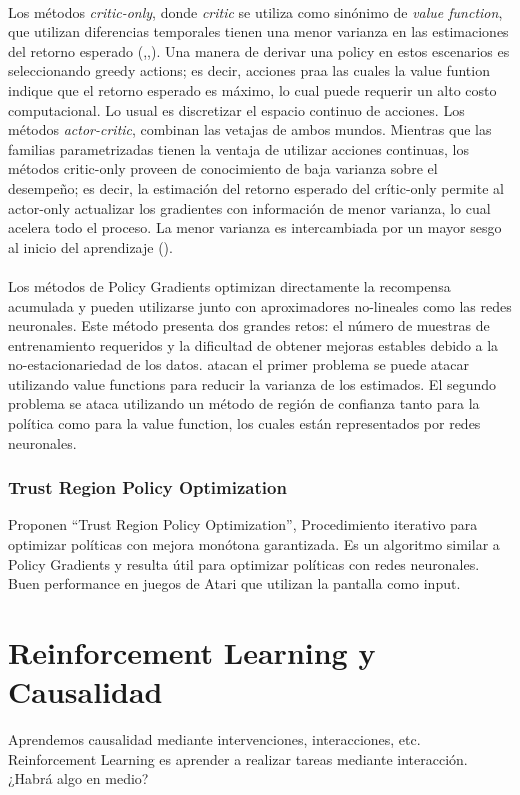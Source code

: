 \documentclass[11pt]{article}
\theoremstyle{plain}
\begin{document}
 \\
Los métodos \textit{critic-only}, donde \textit{critic} se utiliza como sinónimo de \textit{value function}, que utilizan diferencias temporales tienen una menor varianza en las estimaciones del retorno esperado (\cite{boyan2002technical},\cite{berenji2003convergent},\cite{sutton1988learning}). Una manera de derivar una policy en estos escenarios es seleccionando greedy actions; es decir, acciones praa las cuales la value funtion indique que el retorno esperado es máximo, lo cual puede requerir un alto costo computacional. Lo usual es discretizar el espacio continuo de acciones.
Los métodos \textit{actor-critic}, combinan las vetajas de ambos mundos. Mientras que las familias parametrizadas tienen la ventaja de utilizar acciones continuas, los métodos critic-only proveen de conocimiento de baja varianza sobre el desempeño; es decir, la estimación del retorno esperado del crític-only permite al actor-only actualizar los gradientes con información de menor varianza, lo cual acelera todo el proceso. La menor varianza es intercambiada por un mayor sesgo al inicio del aprendizaje (\cite{berenji2003convergent}). \\
\\
Los métodos de Policy Gradients optimizan directamente la recompensa acumulada y pueden utilizarse junto con aproximadores no-lineales como las redes neuronales. Este método presenta dos grandes retos: el número de muestras de entrenamiento requeridos y la dificultad de obtener mejoras estables debido a la no-estacionariedad de los datos.  \cite{DBLP:journals/corr/SchulmanMLJA15} atacan el primer problema se puede atacar utilizando value functions para reducir la varianza de los estimados. El segundo problema se ataca utilizando un método de región de confianza tanto para la política como para la value function, los cuales están representados por redes neuronales.\\
\subsubsection{Trust Region Policy Optimization}
 \cite{DBLP:journals/corr/SchulmanLMJA15} Proponen “Trust Region Policy Optimization”, Procedimiento iterativo para optimizar políticas con mejora monótona garantizada. Es un algoritmo similar a Policy Gradients y resulta útil para optimizar políticas con redes neuronales. Buen performance en juegos de Atari que utilizan la pantalla como input.

 
\section{Reinforcement Learning y Causalidad}
Aprendemos causalidad mediante intervenciones, interacciones, etc. Reinforcement Learning es aprender a realizar tareas mediante interacción. ¿Habrá algo en medio?
\end{document}
